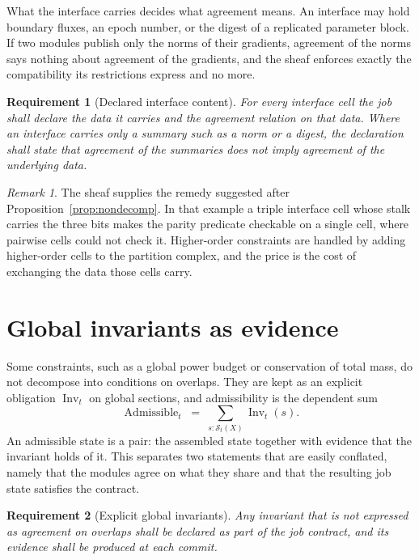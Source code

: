 \documentclass[11pt,openany]{book}
\newtheorem{requirement}{Requirement}[chapter]
\theoremstyle{remark}
\newtheorem{remark}{Remark}[chapter]
\begin{document}
What the interface carries decides what agreement means. An interface may hold boundary fluxes, an epoch number, or the digest of a replicated parameter block. If two modules publish only the norms of their gradients, agreement of the norms says nothing about agreement of the gradients, and the sheaf enforces exactly the compatibility its restrictions express and no more.

\begin{requirement}[Declared interface content]
For every interface cell the job shall declare the data it carries and the agreement relation on that data. Where an interface carries only a summary such as a norm or a digest, the declaration shall state that agreement of the summaries does not imply agreement of the underlying data.
\end{requirement}

\begin{remark}
The sheaf supplies the remedy suggested after Proposition~\ref{prop:nondecomp}. In that example a triple interface cell whose stalk carries the three bits makes the parity predicate checkable on a single cell, where pairwise cells could not check it. Higher-order constraints are handled by adding higher-order cells to the partition complex, and the price is the cost of exchanging the data those cells carry.
\end{remark}

\section{Global invariants as evidence}

Some constraints, such as a global power budget or conservation of total mass, do not decompose into conditions on overlaps. They are kept as an explicit obligation $\operatorname{Inv}_t$ on global sections, and admissibility is the dependent sum
\[
\operatorname{Admissible}_t\;=\;\sum_{s:\mathcal S_t(X)}\operatorname{Inv}_t(s).
\]
An admissible state is a pair: the assembled state together with evidence that the invariant holds of it. This separates two statements that are easily conflated, namely that the modules agree on what they share and that the resulting job state satisfies the contract.

\begin{requirement}[Explicit global invariants]
Any invariant that is not expressed as agreement on overlaps shall be declared as part of the job contract, and its evidence shall be produced at each commit.
\end{requirement}
\end{document}
